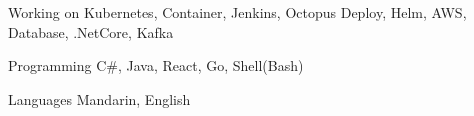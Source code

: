 

\begin{cvskills}

  \cvskill
    {Working on} %
    {Kubernetes, Container, Jenkins, Octopus Deploy, Helm, AWS, Database, .NetCore, Kafka} %

  \cvskill
    {Programming} %
    {C\#, Java, React, Go, Shell(Bash)} %

  \cvskill
    {Languages} %
    {Mandarin, English} %

\end{cvskills}
